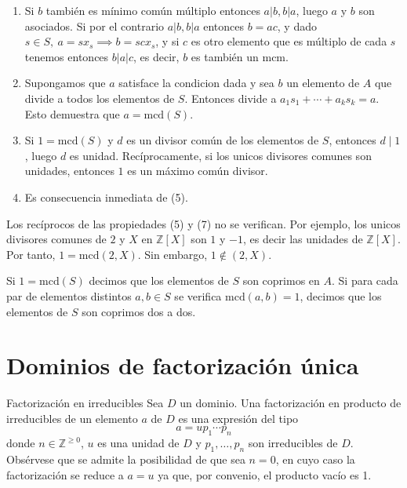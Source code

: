 \begin{proofbox}
\begin{enumerate}
\item Si $b$ también es mínimo común múltiplo entonces $a | b, b | a$, luego $a$ y $b$ son asociados. Si por el contrario $a | b, b | a$ entonces $b = ac$, y dado $s \in S,\ a = sx_s \implies b = scx_s$, y si $c$ es otro elemento que es múltiplo de cada $s$ tenemos entonces $b | a | c$, es decir, $b$ es también un $\text{mcm}$.

\item Supongamos que \(a\) satisface la condicion dada y sea \(b\) un elemento de \(A\) que divide a todos los elementos de \(S\). Entonces divide a \(a_1 s_1 + \cdots + a_k s_k = a\). Esto demuestra que \(a = \mathrm{mcd}(S)\).

\item Si \(1 = \mathrm{mcd}(S)\) y \(d\) es un divisor común de los elementos de \(S\), entonces \(d \mid 1\), luego \(d\) es unidad. Recíprocamente, si los unicos divisores comunes son unidades, entonces \(1\) es un máximo común divisor.

\item Es consecuencia inmediata de (5).
\end{enumerate}

\end{proofbox}

\begin{example}{}{}
Los recíprocos de las propiedades (5) y (7) no se verifican. Por ejemplo, los unicos divisores comunes de \(2\) y \(X\) en \(\mathbb{Z}[X]\) son \(1\) y \(-1\), es decir las unidades de \(\mathbb{Z}[X]\). Por tanto, \(1 = \mathrm{mcd}(2,X)\). Sin embargo, \(1 \not\in (2,X)\).
\end{example}

Si \(1 = \mathrm{mcd}(S)\) decimos que los elementos de \(S\) son coprimos en \(A\). Si para cada par de elementos distintos \(a, b \in S\) se verifica \(\mathrm{mcd}(a,b) = 1\), decimos que los elementos de \(S\) son coprimos dos a dos.

\clearpage
\section{Dominios de factorización única}

\begin{definition}{Factorización en irreducibles}{}
Sea \(D\) un dominio. Una factorización en producto de irreducibles de un elemento \(a\) de \(D\) es una expresión del tipo
\[
a = u p_1 \cdots p_n
\]
donde \(n \in \mathbb{Z}^{\geq 0}\), \(u\) es una unidad de \(D\) y \(p_1, \ldots, p_n\) son irreducibles de \(D\). Obsérvese que se admite la posibilidad de que sea $n = 0$, en cuyo caso la factorización se reduce a $a = u$ ya que, por convenio, el producto vacío es 1.
\end{definition}


